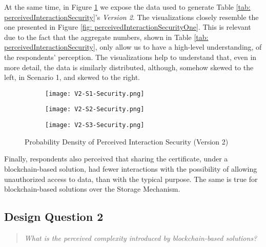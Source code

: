 At the same time, in Figure \ref{fig: perceivedInteractionSecurityTwo} we expose the data used to generate Table \ref{tab: perceivedInteractionSecurity}'s \textit{Version 2}. The visualizations closely resemble the one presented in Figure \ref{fig: perceivedInteractionSecurityOne}. This is relevant due to the fact that the aggregate numbers, shown in Table \ref{tab: perceivedInteractionSecurity}, only allow us to have a high-level understanding, of the respondents' perception. The visualizations help to understand that, even in more detail, the data is similarly distributed, although, somehow skewed to the left, in Scenario 1, and skewed to the right.

\begin{figure}[htb]
	\centering
	\begin{subfigure}[b]{0.49\textwidth}
		\centering
		\texttt{[image: V2-S1-Security.png]}
	\end{subfigure}
	\begin{subfigure}[b]{0.49\textwidth}
		\centering
		\texttt{[image: V2-S2-Security.png]}
	\end{subfigure}
	\hfill
	\begin{subfigure}[b]{0.49\textwidth}
		\centering
		\texttt{[image: V2-S3-Security.png]}
	\end{subfigure}

	\caption{Probability Density of Perceived Interaction Security (Version 2)}
	\label{fig: perceivedInteractionSecurityTwo}
\end{figure}

Finally, respondents also perceived that sharing the certificate, under a blockchain-based solution, had fewer interactions with the possibility of allowing unauthorized access to data, than with the typical purpose. The same is true for blockchain-based solutions over the Storage Mechanism.

\subsection{Design Question 2}

\begin{quote}
	\textit{What is the perceived complexity introduced by blockchain-based solutions?}
\end{quote}

